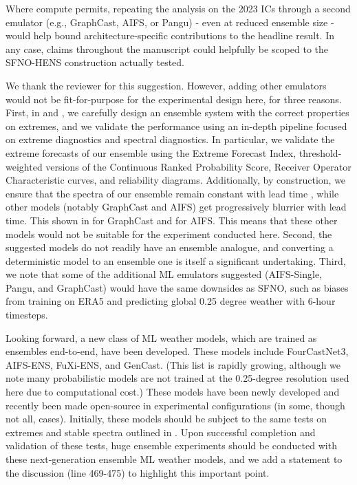 \documentclass[11pt]{article}
\newcommand{\newTxt}{\textcolor{cadmiumgreen}}
\begin{document}
\begin{enumerate}
Where compute permits, repeating the analysis on the 2023 ICs through a second emulator (e.g., GraphCast, AIFS, or Pangu) - even at reduced ensemble size - would help bound architecture-specific contributions to the headline result. In any case, claims throughout the manuscript could helpfully be scoped to the SFNO-HENS construction actually tested.

\newTxt{We thank the reviewer for this suggestion. However, adding other emulators would not be fit-for-purpose for the experimental design here, for three reasons. First, in \cite{Mahesh2024hugeensemblesidesign} and \cite{Mahesh2024hugeensemblespartii}, we carefully design an ensemble system with the correct properties on extremes, and we validate the performance using an in-depth pipeline focused on extreme diagnostics and spectral diagnostics.  In particular, we validate the extreme forecasts of our ensemble using the Extreme Forecast Index, threshold-weighted versions of the Continuous Ranked Probability Score, Receiver Operator Characteristic curves, and reliability diagrams.  Additionally, by construction, we ensure that the spectra of our ensemble remain constant with lead time \cite{Mahesh2024hugeensemblesidesign}, while other models (notably GraphCast and AIFS) get progressively blurrier with lead time.  This shown in \cite{Kochkov2024} for GraphCast and \cite{Lang2024} for AIFS.  This means that these other models would not be suitable for the experiment conducted here.  Second, the suggested models do not readily have an ensemble analogue, and converting a deterministic model to an ensemble one is itself a significant undertaking.  Third, we note that some of the additional ML emulators suggested (AIFS-Single, Pangu, and GraphCast) would have the same downsides as SFNO, such as biases from training on ERA5 and predicting global 0.25 degree weather with 6-hour timesteps.}

\vspace{1ex}


\newTxt{Looking forward, a new class of ML weather models, which are trained as ensembles end-to-end, have been developed.  These models include FourCastNet3, AIFS-ENS, FuXi-ENS, and GenCast.  (This list is rapidly growing, although we note many probabilistic models are not trained at the 0.25-degree resolution used here due to computational cost.)  These models have been newly developed and recently been made open-source in experimental configurations (in some, though not all, cases).  Initially, these models should be subject to the same tests on extremes and stable spectra outlined in \cite{Mahesh2024hugeensemblesidesign}.  Upon successful completion and validation of these tests, huge ensemble experiments should be conducted with these next-generation ensemble ML weather models, and we add a statement to the discussion (line 469-475) to highlight this important point.}


\end{enumerate}
\end{document}
